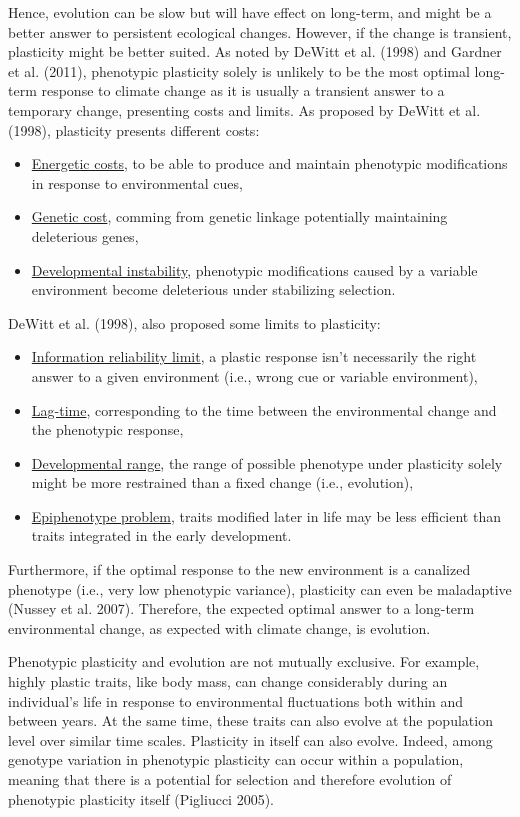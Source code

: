 \documentclass[
  12pt,
  letterpaper,
]{scrartcl}
\providecommand{\tightlist}{%
  \setlength{\itemsep}{0pt}\setlength{\parskip}{0pt}}
\begin{document}
Hence, evolution can be slow but will have effect on long-term, and
might be a better answer to persistent ecological changes. However, if
the change is transient, plasticity might be better suited. As noted by
DeWitt et al. (1998) and Gardner et al. (2011), phenotypic plasticity
solely is unlikely to be the most optimal long-term response to climate
change as it is usually a transient answer to a temporary change,
presenting costs and limits. As proposed by DeWitt et al. (1998),
plasticity presents different costs:

\begin{itemize}
\tightlist
\item
  \ul{Energetic costs}, to be able to produce and maintain phenotypic
  modifications in response to environmental cues,
\item
  \ul{Genetic cost}, comming from genetic linkage potentially
  maintaining deleterious genes,
\item
  \ul{Developmental instability}, phenotypic modifications caused by a
  variable environment become deleterious under stabilizing selection.
\end{itemize}

DeWitt et al. (1998), also proposed some limits to plasticity:

\begin{itemize}
\tightlist
\item
  \ul{Information reliability limit}, a plastic response isn't
  necessarily the right answer to a given environment (i.e., wrong cue
  or variable environment),
\item
  \ul{Lag-time}, corresponding to the time between the environmental
  change and the phenotypic response,
\item
  \ul{Developmental range}, the range of possible phenotype under
  plasticity solely might be more restrained than a fixed change (i.e.,
  evolution),
\item
  \ul{Epiphenotype problem}, traits modified later in life may be less
  efficient than traits integrated in the early development.
\end{itemize}

Furthermore, if the optimal response to the new environment is a
canalized phenotype (i.e., very low phenotypic variance), plasticity can
even be maladaptive (Nussey et al. 2007). Therefore, the expected
optimal answer to a long-term environmental change, as expected with
climate change, is evolution.

Phenotypic plasticity and evolution are not mutually exclusive. For
example, highly plastic traits, like body mass, can change considerably
during an individual's life in response to environmental fluctuations
both within and between years. At the same time, these traits can also
evolve at the population level over similar time scales. Plasticity in
itself can also evolve. Indeed, among genotype variation in phenotypic
plasticity can occur within a population, meaning that there is a
potential for selection and therefore evolution of phenotypic plasticity
itself (Pigliucci 2005).
\end{document}
